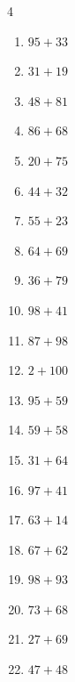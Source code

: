 \begin{multicols}{4}
\begin{enumerate}
  \item $95+33$
        \phantom{$=128$}

  \item $31+19$
        \phantom{$=50$}

  \item $48+81$
        \phantom{$=129$}

  \item $86+68$
        \phantom{$=154$}

  \item $20+75$
        \phantom{$=95$}

  \item $44+32$
        \phantom{$=76$}

  \item $55+23$
        \phantom{$=78$}

  \item $64+69$
        \phantom{$=133$}

  \item $36+79$
        \phantom{$=115$}

  \item $98+41$
        \phantom{$=139$}

  \item $87+98$
        \phantom{$=185$}

  \item $2+100$
        \phantom{$=102$}

  \item $95+59$
        \phantom{$=154$}

  \item $59+58$
        \phantom{$=117$}

  \item $31+64$
        \phantom{$=95$}

  \item $97+41$
        \phantom{$=138$}

  \item $63+14$
        \phantom{$=77$}

  \item $67+62$
        \phantom{$=129$}

  \item $98+93$
        \phantom{$=191$}

  \item $73+68$
        \phantom{$=141$}

  \item $27+69$
        \phantom{$=96$}

  \item $47+48$
        \phantom{$=95$}


\end{enumerate}
\end{multicols}
